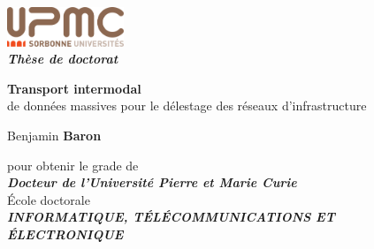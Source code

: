 \pagestyle{empty}
 
\begingroup
  \setlength{\parindent}{0pt}
  \setlength{\parskip}{6pt}
  \setlength{\leftskip}{15pt}
  \linespread{1.1}
    {\begingroup %
    \raggedleft %
    \vspace*{\baselineskip} %
    {\Large {\includegraphics[width=3.5cm]{figures/upmc.pdf}}}\\[0.167\textheight]
    
    {\LARGE\bfseries\itshape {Thèse de doctorat}}\\[\baselineskip] %
    \begin{adjustwidth}{1cm}{0cm}
        \raggedleft
        \textcolor{partcolor}{\Huge \textsf{\textbf{Transport intermodal}\protect\\ de données massives pour le délestage des réseaux d’infrastructure}}
    \end{adjustwidth}
    
    {\Large \textsf{Benjamin \textbf{Baron}}}\par %
    
    \vfill %
    \begin{center}
	    {pour obtenir le grade de}\\[1mm]
	    {\large\bfseries\itshape Docteur de l’Université Pierre et Marie Curie}\\[3mm]
	    {École doctorale}\\[1mm]
			{\large\bfseries\itshape INFORMATIQUE, TÉLÉCOMMUNICATIONS ET ÉLECTRONIQUE}
			

\end{center}}

